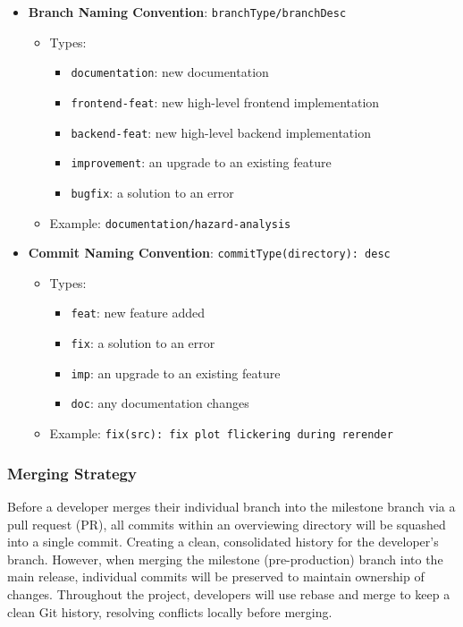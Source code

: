 \documentclass{article}
\begin{document}
\begin{itemize}
    \item \textbf{Branch Naming Convention}: \texttt{branchType/branchDesc}
        \begin{itemize}
            \item Types:
                \begin{itemize}
                    \item \texttt{documentation}: new documentation
                    \item \texttt{frontend-feat}: new high-level frontend implementation
                    \item \texttt{backend-feat}: new high-level backend implementation
                    \item \texttt{improvement}: an upgrade to an existing feature
                    \item \texttt{bugfix}: a solution to an error
                \end{itemize}
            \item Example: \texttt{documentation/hazard-analysis}
        \end{itemize}
    \item \textbf{Commit Naming Convention}: \texttt{commitType(directory): desc}
        \begin{itemize}
            \item Types:
                \begin{itemize}
                    \item \texttt{feat}: new feature added
                    \item \texttt{fix}: a solution to an error
                    \item \texttt{imp}: an upgrade to an existing feature
                    \item \texttt{doc}: any documentation changes
                \end{itemize}
            \item Example: \texttt{fix(src): fix plot flickering during rerender}
        \end{itemize}
\end{itemize}

\subsubsection{Merging Strategy}

Before a developer merges their individual branch into the milestone branch 
via a pull request (PR), all commits within an overviewing directory will be 
squashed into a single commit. Creating a clean, consolidated history for the 
developer’s branch. However, when merging the milestone (pre-production) 
branch into the main release, individual commits will be preserved
to maintain ownership of changes. Throughout the project, developers 
will use rebase and merge to keep a clean Git history, resolving conflicts 
locally before merging.
\end{document}
